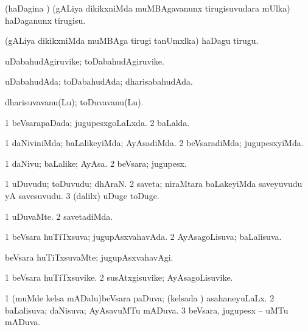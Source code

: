 {\bentry
{} 
\gl{\sakirx}
\bmng
(haDagina \vi) (gALiya dikikxniMda muMBAgavanunx tirugisuvudara mUlka) haDaganunx tirugisu. 
\emng

\noindent 
\gl{\akirx}
\expl{}
\bmng
(gALiya dikikxniMda muMBAga tirugi tanUmxlka) haDagu tirugu. 
\emng
\eentry

\bentry
{} 
\gl{\nA}
\expl{}
\bmng
uDabahudAgiruvike; toDabahudAgiruvike. 
\emng
\eentry

\bentry
{} 
\gl{\gu}
\expl{}
\bmng
uDabahudAda; toDabahudAda; dharisabahudAda. 
\emng
\eentry

\bentry
{} 
\gl{\nA}
\expl{}
\bmng
dharisuvavanu(Lu); toDuvavanu(Lu). 
\emng
\eentry

\bentry
{} 
\gl{\gu}
\expl{}
\bmng
\bnum
\num{1} beVsarapaDada; jugupesxgoLaLxda. 
\num{2} baLalda. 
\enum
\emng
\eentry

\bentry
{} 
\gl{\kirxvi}
\expl{}
\bmng
\bnum
\num{1} daNiviniMda; baLalikeyiMda; AyAsadiMda. 
\num{2} beVsaradiMda; jugupesxyiMda. 
\enum
\emng
\eentry

\bentry
{} 
\gl{\nA}
\expl{}
\bmng
\bnum
\num{1} daNivu; baLalike; AyAsa. 
\num{2} beVsara; jugupesx. 
\enum
\emng
\eentry

\bentry
{} 
\gl{\nA}
\expl{}
\bmng
\bnum
\num{1} uDuvudu; toDuvudu; dhAraN. 
\num{2} saveta; niraMtara baLakeyiMda saveyuvudu yA savesuvudu. 
\num{3} (\bava dalilx) uDuge toDuge. 
\enum
\emng
\eentry

\bentry
{} 
\gl{\kirxvi}
\expl{}
\bmng
\bnum
\num{1} uDuvaMte. 
\num{2} savetadiMda. 
\enum
\emng
\eentry

\bentry
{} 
\gl{\gu}
\expl{}
\bmng
\bnum
\num{1} beVsara huTiTxsuva; jugupAsxvahavAda. 
\num{2} AyAsagoLisuva; baLalisuva. 
\enum
\emng
\eentry

\bentry
{} 
\gl{\kirxvi}
\expl{}
\bmng
beVsara huTiTxsuvaMte; jugupAsxvahavAgi. 
\emng
\eentry

\bentry
{} 
\gl{\nA}
\bmng
\bnum
\num{1} beVsara huTiTxsuvike. 
\num{2} susAtxgisuvike; AyAsagoLisuvike. 
\enum
\emng
\eentry

\bentry
{} 
\gl{\gu}
\bmng
\bnum
\num{1} (muMde kelsa mADalu)beVsara paDuva; (kelsada \vi) asahaneyuLaLx. 
\num{2} baLalisuva; daNisuva; AyAsavuMTu mADuva. 
\num{3} beVsara, jugupesx -- uMTu mADuva. 
\enum
\emng
\eentry

}
